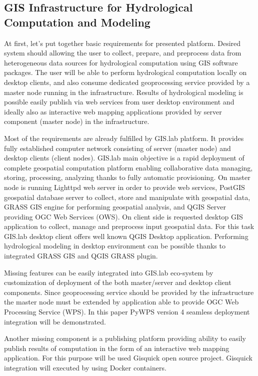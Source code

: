 \documentclass{isprs}
\begin{document}
\subsection{GIS Infrastructure for Hydrological Computation and
  Modeling}\label{GIS Infrastructure for Hydrological Computation and
  Modeling}

At first, let's put together basic requirements for presented
platform. Desired system should allowing the user to collect, prepare,
and preprocess data from heterogeneous data sources for hydrological
computation using GIS software packages. The user will be able to
perform hydrological computation locally on desktop clients, and also
consume dedicated geoprocessing service provided by a master node
running in the infrastructure. Results of hydrological modeling is
possible easily publish via web services from user desktop environment
and ideally also as interactive web mapping applications provided by
server component (master node) in the infrastructure.

Most of the requirements are already fulfilled by GIS.lab platform. It
provides fully established computer network consisting of server
(master node) and desktop clients (client nodes). GIS.lab main
objective is a rapid deployment of complete geospatial computation
platform enabling collaborative data managing, storing, processing,
analyzing thanks to fully automatic provisioning. On master node is
running Lighttpd web server in order to provide web services, PostGIS
geospatial database server to collect, store and manipulate with
geospatial data, GRASS GIS engine for performing geospatial analysis,
and QGIS Server providing OGC Web Services (OWS). On client side is
requested desktop GIS application to collect, manage and preprocess
input geospatial data. For this task GIS.lab desktop client offers
well known QGIS Desktop application. Performing hydrological modeling
in desktop environment can be possible thanks to integrated GRASS GIS
and QGIS GRASS plugin.

Missing features can be easily integrated into GIS.lab eco-system by
customization of deployment of the both master/server and desktop
client components. Since geoprocessing service should be provided by
the infrastructure the master node must be extended by application
able to provide OGC Web Processing Service (WPS). In this paper PyWPS
version 4 seamless deployment integration will be demonstrated.

Another missing component is a publishing platform providing ability
to easily publish results of computation in the form of an interactive
web mapping application. For this purpose will be used Gisquick open
source project. Gisquick integration will executed by using Docker
containers.
\end{document}
